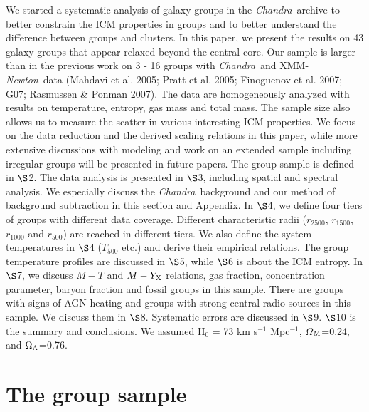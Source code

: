 \documentclass{aastex}
\def\chandra    {{\em Chandra}\/}
\def\xmm        {XMM-{\em Newton}\/}
\begin{document}
We started a systematic analysis of galaxy groups in the \chandra\ archive to better
constrain the ICM properties in groups and to better understand the difference
between groups and clusters. In this paper, we present the results on 43 galaxy
groups that appear relaxed beyond the central core. Our sample is larger
than in the previous work on 3 - 16 groups with \chandra\  and \xmm\ data
(Mahdavi et al. 2005; Pratt et al. 2005; Finoguenov et al. 2007; G07; Rasmussen \&
Ponman 2007). The data are homogeneously analyzed with results on temperature, entropy,
gas mass and total mass. The sample size also allows us to measure the scatter in
various interesting ICM properties.
We focus on the data reduction and the derived scaling relations in this
paper, while more extensive discussions with modeling and work on an extended
sample including irregular groups will be presented in future papers.
The group sample is defined in $\S$2. The data analysis is presented
in $\S$3, including spatial and spectral analysis. We especially discuss the
\chandra\ background and our method of background subtraction in this section and
Appendix. In $\S$4, we define four tiers of groups with different data coverage.
Different characteristic radii ($r_{2500}$, $r_{1500}$, $r_{1000}$ and $r_{500}$)
are reached in different tiers. We also define the system temperatures
in $\S$4 ($T_{500}$ etc.) and derive their empirical relations.
The group temperature profiles are discussed
in $\S$5, while $\S$6 is about the ICM entropy. In $\S$7, we discuss $M - T$ and
$M - Y_{\rm X}$ relations, gas fraction, concentration parameter, baryon fraction and fossil
groups in this sample. There are groups with signs of AGN heating and
groups with strong central radio sources in this sample. We discuss them in $\S$8.
Systematic errors are discussed in $\S$9. $\S$10 is the summary and conclusions.
We assumed H$_{0}$ = 73 km s$^{-1}$ Mpc$^{-1}$, $\Omega$$_{\rm M}$=0.24,
and $\Omega_{\rm \Lambda}$=0.76.

\section{The group sample}
\end{document}
